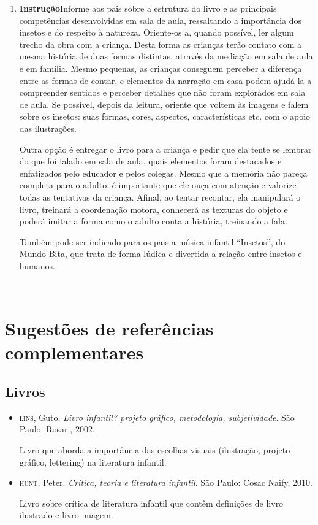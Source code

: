 \documentclass[11pt]{extarticle}
\begin{document}
\begin{enumerate}
\item \textbf{Instrução}\quad Informe aos pais sobre a estrutura do livro e as principais competências desenvolvidas em sala de aula, ressaltando a importância dos insetos e do respeito à natureza.
Oriente-os a, quando possível, ler algum trecho da obra com a criança.
Desta forma as crianças terão contato com a mesma história de duas formas distintas, através da mediação em sala de aula e em família. 
Mesmo pequenas, as crianças conseguem perceber a diferença entre 
as formas de contar, e elementos da narração em casa podem ajudá-la a compreender 
sentidos e perceber detalhes que não foram explorados em sala de aula. Se possível, depois da leitura, oriente 
que voltem às imagens e falem sobre os insetos: suas formas, cores, aspectos, características etc. com o apoio das  ilustrações. 

Outra opção é entregar o livro para a criança e pedir que ela tente se lembrar
do que foi falado em sala de aula, quais elementos foram destacados e enfatizados pelo educador e pelos colegas. Mesmo que a memória não pareça 
completa para o adulto, é importante que ele ouça com atenção e 
valorize todas as tentativas da criança. Afinal, ao tentar recontar, 
ela manipulará o livro, treinará a coordenação motora, conhecerá as texturas 
do objeto e poderá imitar a forma como o adulto 
conta a história, treinando a fala. 

Também pode ser indicado para os pais a música infantil ``Insetos'', do Mundo Bita, que trata de forma lúdica e divertida a relação entre insetos e humanos.
\end{enumerate}

 
\section{Sugestões de referências complementares}

\subsection{Livros} 

\begin{itemize}
\item \textsc{lins}, Guto. \textit{Livro infantil? projeto gráfico, metodologia, subjetividade}. São Paulo: Rosari, 2002.

Livro que aborda a importância das escolhas visuais (ilustração, projeto gráfico, lettering) na literatura infantil.  

\item \textsc{hunt}, Peter. \textit{Crítica, teoria e literatura infantil}. São Paulo: Cosac Naify, 2010.

Livro sobre crítica de literatura infantil que contêm definições de livro ilustrado e livro imagem. 
\end{itemize}
\end{document}
